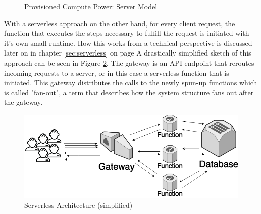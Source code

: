 \begin{figure}[ht]
    \centering
    \caption {Provisioned Compute Power: Server Model}
    \label{graph:provisionedComputePowerServer}
\end{figure}

With a serverless approach on the other hand, for every client request, the function that executes the steps necessary to fulfill the request is initiated with it's own small runtime. How this works from a technical perspective is discussed later on in chapter \ref{sec:serverless} on page \pageref{sec:serverless} A drastically simplified sketch of this approach can be seen in Figure \ref{fig:serverlessArchHighlevel}. The gateway is an API endpoint that reroutes incoming requests to a server, or in this case a serverless function that is initiated. \autocite{Kelly2010UsingInvalidation} This gateway distributes the calls to the newly spun-up functions which is called "fan-out"\autocite{Do2013Limplock}, a term that describes how the system structure fans out after the gateway. 

\begin{figure}[ht]
    \includegraphics[width=\linewidth]{images/drawio/lambda.png}\centering
    \caption {Serverless Architecture (simplified)}
    \label{fig:serverlessArchHighlevel}
\end{figure}

